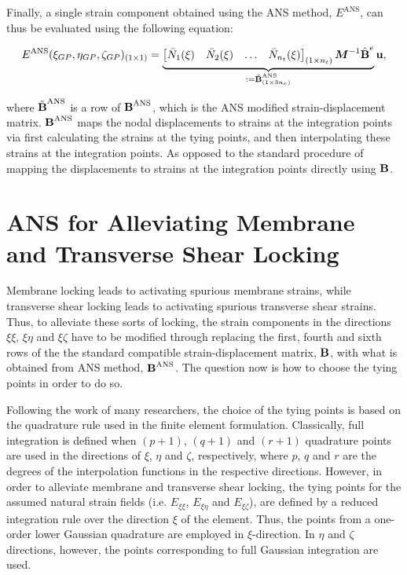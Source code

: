 \documentclass[12pt]{article}
\begin{document}
Finally, a single strain component obtained using the ANS method, $E^{\text{ANS}}$, can thus be evaluated using the following equation:

\begin{equation}
E^{\text{ANS}} (\xi_{GP}, \eta_{GP}, \zeta_{GP})_{(1 \times 1)} = 
\underbrace{\begin{bmatrix}
\bar{N}_1(\xi) & \bar{N}_2(\xi) & \ldots & \bar{N}_{n_t}(\xi)\\
\end{bmatrix}_{(1 \times n_t)}
\boldsymbol{M}^{-1} \hat{\text{\bf{B}}}^e}_{:= \tilde{\text{\bf{B}}}^{\text{ANS}}_{(1 \times 3n_e)}} \text{\bf{u}},
\end{equation}

\noindent
where $\tilde{\text{\bf{B}}}^{\text{ANS}}$ is a row of $\text{\bf{B}}^{\text{ANS}}$, which is the ANS modified strain-displacement matrix. $\text{\bf{B}}^{\text{ANS}}$ maps the nodal displacements to strains at the integration points via first calculating the strains at the tying points, and then interpolating these strains at the integration points. As opposed to the standard procedure of mapping the displacements to strains at the integration points directly using $\text{\bf{B}}$.











\section{ANS for Alleviating Membrane and Transverse Shear Locking}

Membrane locking leads to activating spurious membrane strains, while transverse shear locking leads to activating spurious transverse shear strains. Thus, to alleviate these sorts of locking, the strain components in the directions $\xi \xi$, $\xi \eta$ and $\xi \zeta$ have to be modified through replacing the first, fourth and sixth rows of the the standard compatible strain-displacement matrix, $\text{\bf{B}}$, with what is obtained from ANS method, $\text{\bf{B}}^{\text{ANS}}$. The question now is how to choose the tying points in order to do so.

Following the work of many researchers, the choice of the tying points is based on the quadrature rule used in the finite element formulation. Classically, full integration is defined when $(p+1)$, $(q+1)$ and $(r+1)$ quadrature points are used in the directions of $\xi$, $\eta$ and $\zeta$, respectively, where $p$, $q$ and $r$ are the degrees of the interpolation functions in the respective directions. However, in order to alleviate membrane and transverse shear locking, the tying points for the assumed natural strain fields (i.e. $E_{\xi \xi}$, $E_{\xi \eta}$ and $E_{\xi \zeta}$), are defined by a reduced integration rule over the direction $\xi$ of the element. Thus, the points from a one-order lower Gaussian quadrature are employed in $\xi$-direction. In $\eta$ and $\zeta$ directions, however, the points corresponding to full Gaussian integration are used.
\end{document}

